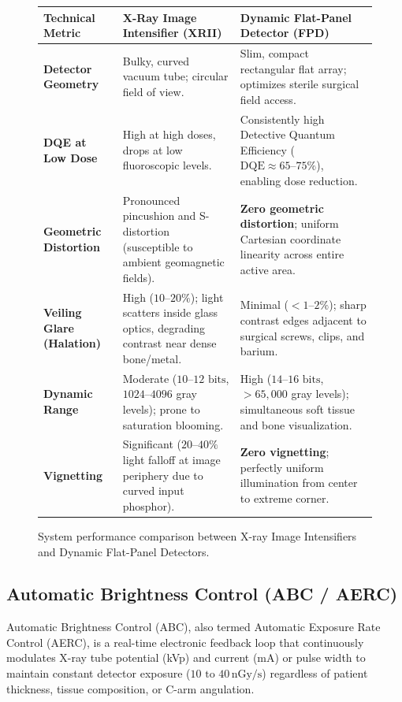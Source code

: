 \documentclass[11pt,a4paper]{article}
\begin{document}
\begin{figure}[htbp]
\centering
\begin{tabular}{p{3.5cm}p{5.5cm}p{5.5cm}}
\toprule
\textbf{Technical Metric} & \textbf{X-Ray Image Intensifier (XRII)} & \textbf{Dynamic Flat-Panel Detector (FPD)} \\
\midrule
\textbf{Detector Geometry} & Bulky, curved vacuum tube; circular field of view. & Slim, compact rectangular flat array; optimizes sterile surgical field access. \\
\addlinespace
\textbf{DQE at Low Dose} & High at high doses, drops at low fluoroscopic levels. & Consistently high Detective Quantum Efficiency ($\text{DQE} \approx 65\text{--}75\%$), enabling dose reduction. \\
\addlinespace
\textbf{Geometric Distortion} & Pronounced pincushion and S-distortion (susceptible to ambient geomagnetic fields). & \textbf{Zero geometric distortion}; uniform Cartesian coordinate linearity across entire active area. \\
\addlinespace
\textbf{Veiling Glare (Halation)} & High ($10\text{--}20\%$); light scatters inside glass optics, degrading contrast near dense bone/metal. & Minimal ($< 1\text{--}2\%$); sharp contrast edges adjacent to surgical screws, clips, and barium. \\
\addlinespace
\textbf{Dynamic Range} & Moderate ($10\text{--}12\text{ bits}$, $1024\text{--}4096$ gray levels); prone to saturation blooming. & High ($14\text{--}16\text{ bits}$, $> 65{,}000$ gray levels); simultaneous soft tissue and bone visualization. \\
\addlinespace
\textbf{Vignetting} & Significant ($20\text{--}40\%$ light falloff at image periphery due to curved input phosphor). & \textbf{Zero vignetting}; perfectly uniform illumination from center to extreme corner. \\
\bottomrule
\end{tabular}
\caption{System performance comparison between X-ray Image Intensifiers and Dynamic Flat-Panel Detectors.}
\label{tab:xrii_vs_fpd}
\end{figure}

\subsection{Automatic Brightness Control (ABC / AERC)}

Automatic Brightness Control (ABC), also termed Automatic Exposure Rate Control (AERC), is a real-time electronic feedback loop that continuously modulates X-ray tube potential (kVp) and current (mA) or pulse width to maintain constant detector exposure ($10\text{ to }40\,\text{nGy/s}$) regardless of patient thickness, tissue composition, or C-arm angulation.
\end{document}
